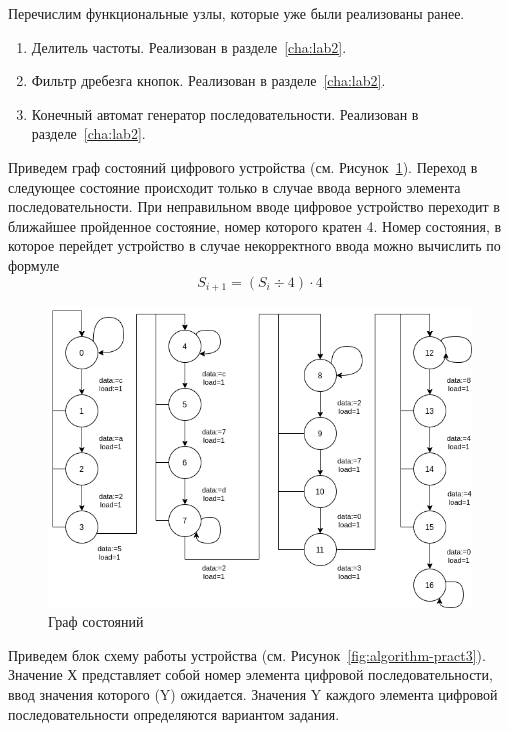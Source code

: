 Перечислим функциональные узлы, которые уже были реализованы ранее. 

\begin{enumerate}
	\item Делитель частоты. Реализован в разделе~\ref{cha:lab2}.
	\item Фильтр дребезга кнопок. Реализован в разделе~\ref{cha:lab2}.
	\item Конечный автомат генератор последовательности. Реализован в разделе~\ref{cha:lab2}.
\end{enumerate}

Приведем граф состояний цифрового устройства (см. Рисунок~\ref{fig:state-graph-pract3}). Переход в следующее состояние происходит только в случае ввода верного элемента последовательности. При неправильном вводе цифровое устройство переходит в ближайшее пройденное состояние, номер которого кратен 4. Номер состояния, в которое перейдет устройство в случае некорректного ввода можно вычислить по формуле 
\[S_{i+1}=(S_i \div 4) \cdot 4\]

\begin{figure}[h!]
	\centering
	\includegraphics[width=0.7\linewidth]{course-plis/images/lab3/state-graph-pract3}
	\caption{Граф состояний}
	\label{fig:state-graph-pract3}
\end{figure}

Приведем блок схему работы устройства (см. Рисунок~\ref{fig:algorithm-pract3}). Значение Х представляет
собой номер элемента цифровой последовательности, ввод значения которого (Y)
ожидается. Значения Y каждого элемента цифровой последовательности определяются
вариантом задания.

